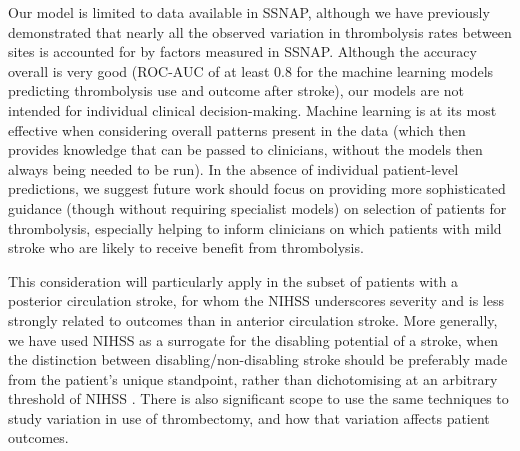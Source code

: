 Our model is limited to data available in SSNAP, although we have previously demonstrated that nearly all the observed variation in thrombolysis rates between sites is accounted for by factors measured in SSNAP. Although the accuracy overall is very good (ROC-AUC of at least 0.8 for the machine learning models predicting thrombolysis use and outcome after stroke), our models are not intended for individual clinical decision-making. Machine learning is at its most effective when considering overall patterns present in the data (which then provides knowledge that can be passed to clinicians, without the models then always being needed to be run). In the absence of individual patient-level predictions, we suggest future work should focus on providing more sophisticated guidance (though without requiring specialist models) on selection of patients for thrombolysis, especially helping to inform clinicians on which patients with mild stroke who are likely to receive benefit from thrombolysis.

This consideration will particularly apply in the subset of patients with a posterior circulation stroke, for whom the NIHSS underscores severity and is less strongly related to outcomes than in anterior circulation stroke. More generally, we have used NIHSS as a surrogate for the disabling potential of a stroke, when the distinction between disabling/non-disabling stroke should be preferably made from the patient's unique standpoint, rather than dichotomising at an arbitrary threshold of NIHSS \cite{braksick_thrombolysis_2024}. There is also significant scope to use the same techniques to study variation in use of thrombectomy, and how that variation affects patient outcomes.